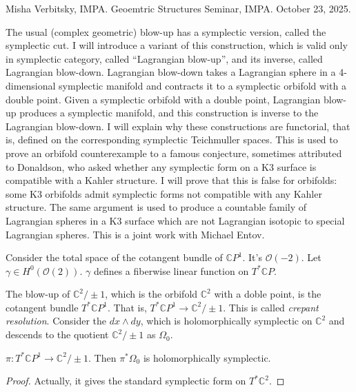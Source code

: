 \noindent
Misha Verbitsky, IMPA.
Geoemtric Structures Seminar, IMPA. 
October 23, 2025.

 The usual (complex geometric) blow-up has a symplectic
version, called the symplectic cut. I will introduce a variant of this
construction, which is valid only in symplectic category, called ``Lagrangian
blow-up'', and its inverse, called Lagrangian blow-down. Lagrangian blow-down
takes a Lagrangian sphere in a 4-dimensional  symplectic manifold and contracts
it to a symplectic orbifold with a double point. Given a symplectic orbifold
with a double point, Lagrangian blow-up produces a symplectic manifold, and this
construction is inverse to the Lagrangian blow-down. I will explain why these
constructions are functorial, that is, defined on the corresponding symplectic
Teichmuller spaces. This is used to prove an orbifold counterexample to a famous
conjecture, sometimes attributed to Donaldson, who asked whether any symplectic
form on a K3 surface is compatible with a Kahler structure. I will prove that
this is false for orbifolds: some K3 orbifolds admit symplectic forms not
compatible with any Kahler structure. The same argument is used to produce a
countable family of Lagrangian spheres in a K3 surface which are not Lagrangian
isotopic to special Lagrangian spheres. This is a joint work with Michael Entov. 



\medskip\noindent


Consider the total space of the cotangent bundle of $\mathbb{C}P^1$.
It's $\mathcal{O}(-2)$.
Let $\gamma \in H^{0}(\mathcal{O}(2))$.
$\gamma$ defines a fiberwise linear function on $T^*\mathbb{C}P$.

The blow-up of $\mathbb{C}^2/\pm 1$, which is the orbifold $\mathbb{C}^2$ with
 a doble point, is the cotangent bundle $T^* \mathbb{C}P^1$.
That is,
$T^*\mathbb{C}P^1 \to \mathbb{C}^2/\pm 1$.
This is called {\it crepant resolution}.
Consider the $dx \wedge dy$, which is holomorphically symplectic
on $\mathbb{C}^2$ and descends to the quotient $\mathbb{C}^2/\pm 1$
as $\Omega_0$.

\begin{proposition}
\label{proposition-}
$\pi:T^*\mathbb{C}P^1 \to \mathbb{C}^2/\pm 1$.
Then $\pi^*\Omega_0$ is holomorphically symplectic.
\end{proposition}

\begin{proof}
Actually, it gives the standard symplectic form on $T^*\mathbb{C}^2$.
\end{proof}

